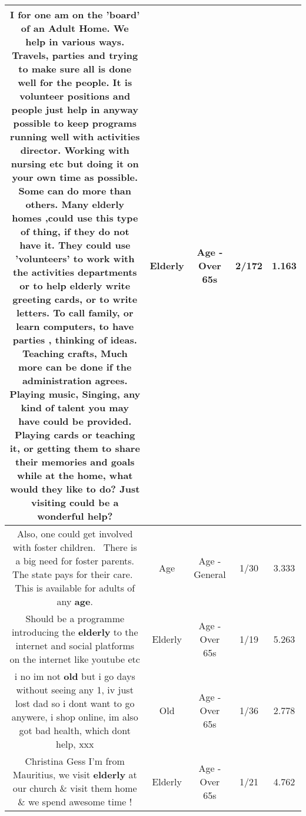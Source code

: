 \documentclass[11pt]{article}
\newlength\mylength
\begin{document}
\begin{center}
\begin{longtable}{|C{.65\mylength}|C{.30\mylength}|C{.12\mylength}|C{.12\mylength}|C{.12\mylength}|}
  \small I for one am on the 'board' of an Adult Home. We help in various ways. Travels, parties and trying to make sure all is done well for the people. It is volunteer positions and people just help in anyway possible to keep programs running well with activities director. Working with nursing etc but doing it on your own time as possible. Some can do more than others. Many \textbf{elderly} homes ,could use this type of thing, if they do not have it. They could use 'volunteers' to work with the activities departments or to help \textbf{elderly} write greeting cards, or to write letters. To call family, or learn computers, to have parties , thinking of ideas.  Teaching crafts, Much more can be done if the administration agrees. Playing music, Singing, any kind of talent you may have could be provided. Playing cards or teaching it, or getting them to share their memories and goals while at the home, what would they like to do?  Just visiting could be a wonderful help?\normalsize   & Elderly & Age - Over 65s & 2/172 & 1.163 \\  \hline
  \small Also, one could get involved with foster children.  There is a big need for foster parents. The state pays for their care.  This is available for adults of any \textbf{age}.\normalsize   & Age & Age - General & 1/30 & 3.333 \\  \hline
  \small Should be a programme introducing the \textbf{elderly} to the internet and social platforms on the internet like youtube etc\normalsize   & Elderly & Age - Over 65s & 1/19 & 5.263 \\  \hline
  \small i no im not \textbf{old} but i go days without seeing any 1, iv just lost dad so i dont want to go anywere, i shop online, im also got bad health, which dont help,  xxx\normalsize   & Old & Age - Over 65s & 1/36 & 2.778 \\  \hline
  \small Christina Gess I'm from Mauritius, we visit \textbf{elderly} at our church \& visit them home \& we spend awesome time !\normalsize   & Elderly & Age - Over 65s & 1/21 & 4.762 \\  \hline

\end{longtable}
\end{center}
\end{document}
